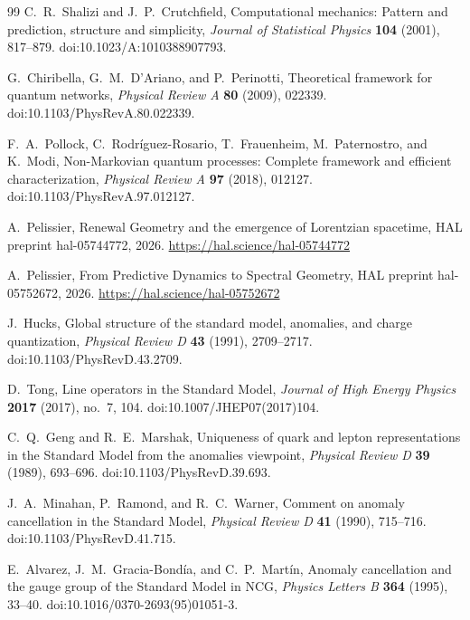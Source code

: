 \documentclass[11pt]{article}
\numberwithin{equation}{section}
\theoremstyle{definition}
\theoremstyle{remark}
\begin{document}
\begin{thebibliography}{99}
C.~R.~Shalizi and J.~P.~Crutchfield,
\newblock Computational mechanics: Pattern and prediction, structure and simplicity,
\newblock \emph{Journal of Statistical Physics} \textbf{104} (2001), 817--879.
\newblock doi:10.1023/A:1010388907793.

G.~Chiribella, G.~M.~D'Ariano, and P.~Perinotti,
\newblock Theoretical framework for quantum networks,
\newblock \emph{Physical Review A} \textbf{80} (2009), 022339.
\newblock doi:10.1103/PhysRevA.80.022339.

F.~A.~Pollock, C.~Rodr\'iguez-Rosario, T.~Frauenheim, M.~Paternostro, and K.~Modi,
\newblock Non-Markovian quantum processes: Complete framework and efficient characterization,
\newblock \emph{Physical Review A} \textbf{97} (2018), 012127.
\newblock doi:10.1103/PhysRevA.97.012127.

A.~Pelissier,
\newblock Renewal Geometry and the emergence of Lorentzian spacetime,
\newblock HAL preprint hal-05744772, 2026.
\newblock \url{https://hal.science/hal-05744772}

A.~Pelissier,
\newblock From Predictive Dynamics to Spectral Geometry,
\newblock HAL preprint hal-05752672, 2026.
\newblock \url{https://hal.science/hal-05752672}

J.~Hucks,
\newblock Global structure of the standard model, anomalies, and charge
quantization,
\newblock \emph{Physical Review D} \textbf{43} (1991), 2709--2717.
\newblock doi:10.1103/PhysRevD.43.2709.

D.~Tong,
\newblock Line operators in the Standard Model,
\newblock \emph{Journal of High Energy Physics} \textbf{2017} (2017),
no.~7, 104.
\newblock doi:10.1007/JHEP07(2017)104.

C.~Q.~Geng and R.~E.~Marshak,
\newblock Uniqueness of quark and lepton representations in the Standard Model
from the anomalies viewpoint,
\newblock \emph{Physical Review D} \textbf{39} (1989), 693--696.
\newblock doi:10.1103/PhysRevD.39.693.

J.~A.~Minahan, P.~Ramond, and R.~C.~Warner,
\newblock Comment on anomaly cancellation in the Standard Model,
\newblock \emph{Physical Review D} \textbf{41} (1990), 715--716.
\newblock doi:10.1103/PhysRevD.41.715.

E.~Alvarez, J.~M.~Gracia-Bond\'ia, and C.~P.~Mart\'in,
\newblock Anomaly cancellation and the gauge group of the Standard Model in
NCG,
\newblock \emph{Physics Letters B} \textbf{364} (1995), 33--40.
\newblock doi:10.1016/0370-2693(95)01051-3.


\end{thebibliography}
\end{document}
